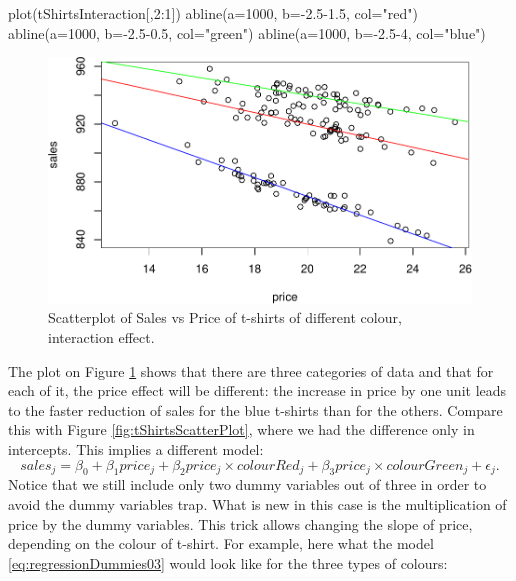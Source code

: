 \documentclass[
]{book}
\newenvironment{Shaded}{\begin{snugshade}}{\end{snugshade}}
\newcommand{\AttributeTok}[1]{\textcolor[rgb]{0.77,0.63,0.00}{#1}}
\newcommand{\DecValTok}[1]{\textcolor[rgb]{0.00,0.00,0.81}{#1}}
\newcommand{\FloatTok}[1]{\textcolor[rgb]{0.00,0.00,0.81}{#1}}
\newcommand{\FunctionTok}[1]{\textcolor[rgb]{0.00,0.00,0.00}{#1}}
\newcommand{\NormalTok}[1]{#1}
\newcommand{\SpecialCharTok}[1]{\textcolor[rgb]{0.00,0.00,0.00}{#1}}
\newcommand{\StringTok}[1]{\textcolor[rgb]{0.31,0.60,0.02}{#1}}
\theoremstyle{definition}
\theoremstyle{definition}
\theoremstyle{definition}
\theoremstyle{definition}
\theoremstyle{remark}
\begin{document}
\begin{Shaded}
\begin{Highlighting}[]
\FunctionTok{plot}\NormalTok{(tShirtsInteraction[,}\DecValTok{2}\SpecialCharTok{:}\DecValTok{1}\NormalTok{])}
\FunctionTok{abline}\NormalTok{(}\AttributeTok{a=}\DecValTok{1000}\NormalTok{, }\AttributeTok{b=}\SpecialCharTok{{-}}\FloatTok{2.5{-}1.5}\NormalTok{, }\AttributeTok{col=}\StringTok{"red"}\NormalTok{)}
\FunctionTok{abline}\NormalTok{(}\AttributeTok{a=}\DecValTok{1000}\NormalTok{, }\AttributeTok{b=}\SpecialCharTok{{-}}\FloatTok{2.5{-}0.5}\NormalTok{, }\AttributeTok{col=}\StringTok{"green"}\NormalTok{)}
\FunctionTok{abline}\NormalTok{(}\AttributeTok{a=}\DecValTok{1000}\NormalTok{, }\AttributeTok{b=}\SpecialCharTok{{-}}\FloatTok{2.5}\DecValTok{{-}4}\NormalTok{, }\AttributeTok{col=}\StringTok{"blue"}\NormalTok{)}
\end{Highlighting}
\end{Shaded}

\begin{figure}
\centering
\includegraphics{Svetunkov---Statistics-for-Business-Analytics_files/figure-latex/tShirtsInteractionScatterPlot-1.pdf}
\caption{\label{fig:tShirtsInteractionScatterPlot}Scatterplot of Sales vs Price of t-shirts of different colour, interaction effect.}
\end{figure}

The plot on Figure \ref{fig:tShirtsInteractionScatterPlot} shows that there are three categories of data and that for each of it, the price effect will be different: the increase in price by one unit leads to the faster reduction of sales for the blue t-shirts than for the others. Compare this with Figure \ref{fig:tShirtsScatterPlot}, where we had the difference only in intercepts. This implies a different model:
\begin{equation}
    sales_j = \beta_0 + \beta_1 price_j + \beta_2 price_j \times colourRed_j + \beta_3 price_j \times colourGreen_j + \epsilon_j .
    \label{eq:regressionDummies03}
\end{equation}
Notice that we still include only two dummy variables out of three in order to avoid the dummy variables trap. What is new in this case is the multiplication of price by the dummy variables. This trick allows changing the slope of price, depending on the colour of t-shirt. For example, here what the model \eqref{eq:regressionDummies03} would look like for the three types of colours:
\end{document}
